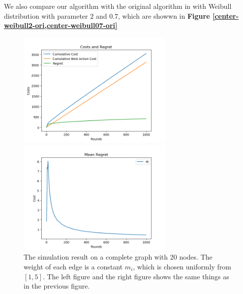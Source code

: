 \documentclass{article}
\theoremstyle{plain}
\theoremstyle{definition}
\theoremstyle{remark}
\begin{document}
    We also compare our algorithm with the original algorithm in \citet{pmlr-v28-chen13a} with Weibull distribution with parameter $2$ and $0.7$, which are showwn in \textbf{Figure \ref{center-weibull2-ori,center-weibull07-ori}}

    \begin{figure}[htbp!]
        \begin{minipage}[h]{0.5\linewidth}
            \centering
            \includegraphics[width=3in]{simple-cost-regret-uni.png}
        \end{minipage}
        \begin{minipage}[h]{0.5\linewidth}
            \centering
            \includegraphics[width=3in]{simple-mean-regret-uni.png}
        \end{minipage}
        \caption{The simulation result on a complete graph with 20 nodes. The weight of each edge is a constant $m_i$, which is chosen uniformly from $[1,5]$. The left figure and the right figure shows the same things as in the previous figure.}
        \label{center-uni}
    \end{figure}
\end{document}
